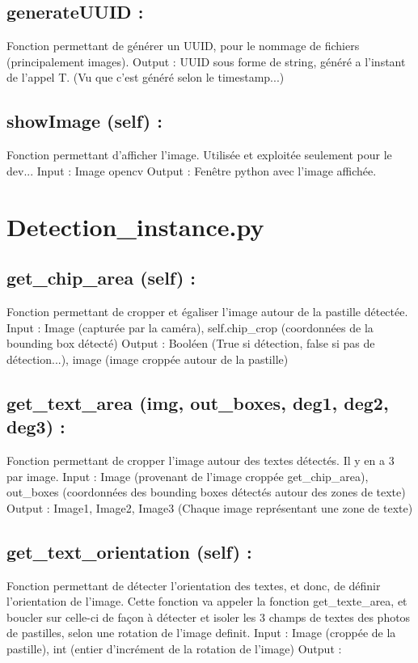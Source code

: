 \subsection{generateUUID :}
Fonction permettant de générer un UUID, pour le nommage de fichiers (principalement images).
Output : UUID sous forme de string, généré a l’instant de l’appel T. (Vu que c’est généré selon le timestamp...)

\subsection{showImage (self) :}
Fonction permettant d’afficher l’image. Utilisée et exploitée seulement pour le dev...
Input : Image opencv
Output : Fenêtre python avec l’image affichée.

\section{Detection_instance.py}
\subsection{get_chip_area (self) :}
Fonction permettant de cropper et égaliser l’image autour de la pastille détectée.
Input : Image (capturée par la caméra), self.chip_crop (coordonnées de la bounding box détecté)
Output : Booléen (True si détection, false si pas de détection...), image (image croppée autour de la pastille)

\subsection{get_text_area (img, out_boxes, deg1, deg2, deg3) :}
Fonction permettant de cropper l’image autour des textes détectés. Il y en a 3 par image.
Input : Image (provenant de l’image croppée get_chip_area), out_boxes (coordonnées des bounding boxes détectés autour des zones de texte)
Output : Image1, Image2, Image3 (Chaque image représentant une zone de texte)

\subsection{get_text_orientation (self) :}
Fonction permettant de détecter l’orientation des textes, et donc, de définir l’orientation de l’image.
Cette fonction va appeler la fonction get_texte_area, et boucler sur celle-ci de façon à détecter et isoler les 3 champs de textes des photos de pastilles, selon une rotation de l’image definit.
Input : Image (croppée de la pastille), int (entier d’incrément de la rotation de l’image)
Output :

